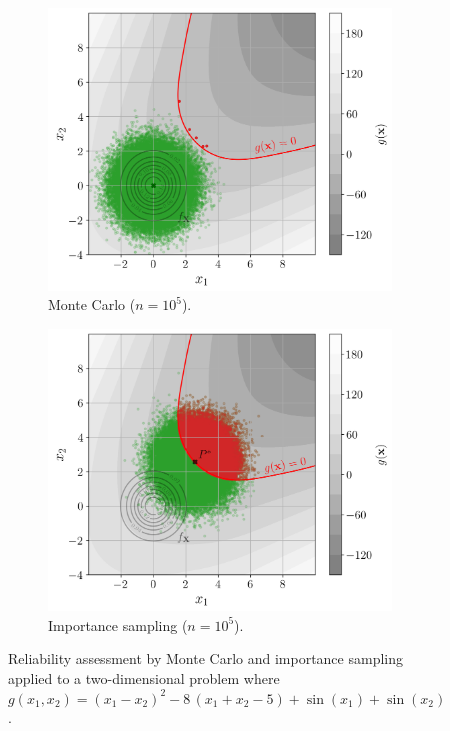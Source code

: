 \begin{figure}[ht]
    \centering
    \begin{subfigure}[b]{0.48\textwidth}
        \centering
        \includegraphics[width=\textwidth]{../numerical_experiments/chapter1/figures/reliability_MC_illustration.png}
        \caption{Monte Carlo ($n=10^5$).}
    \end{subfigure}
    \hfill
    \begin{subfigure}[b]{0.48\textwidth}
        \centering
        \includegraphics[width=\textwidth]{../numerical_experiments/chapter1/figures/reliability_IS_illustration.png}
        \caption{Importance sampling ($n=10^5$).}
    \end{subfigure}
    \caption{Reliability assessment by Monte Carlo and importance sampling applied to a two-dimensional problem where $g(x_1, x_2)=(x_1 - x_2) ^ 2 - 8 \, (x_1 + x_2 - 5) + \sin(x_1) + \sin(x_2)$.}
    \label{fig:IS_reliability}
\end{figure}


